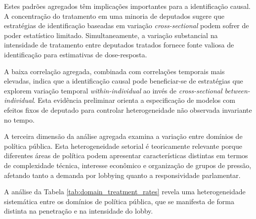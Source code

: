 Estes padrões agregados têm implicações importantes para a identificação causal. A concentração do tratamento em uma minoria de deputados sugere que estratégias de identificação baseadas em variação \textit{cross-sectional} podem sofrer de poder estatístico limitado. Simultaneamente, a variação substancial na intensidade de tratamento entre deputados tratados fornece fonte valiosa de identificação para estimativas de dose-resposta.

A baixa correlação agregada, combinada com correlações temporais mais elevadas, indica que a identificação causal pode beneficiar-se de estratégias que explorem variação temporal \textit{within-individual} ao invés de \textit{cross-sectional between-individual}. Esta evidência preliminar orienta a especificação de modelos com efeitos fixos de deputado para controlar heterogeneidade não observada invariante no tempo.



A terceira dimensão da análise agregada examina a variação entre domínios de política pública. Esta heterogeneidade setorial é teoricamente relevante porque diferentes áreas de política podem apresentar características distintas em termos de complexidade técnica, interesse econômico e organização de grupos de pressão, afetando tanto a demanda por lobbying quanto a responsividade parlamentar.


A análise da Tabela \ref{tab:domain_treatment_rates} revela uma heterogeneidade sistemática entre os domínios de política pública, que se manifesta de forma distinta na penetração e na intensidade do lobby.

